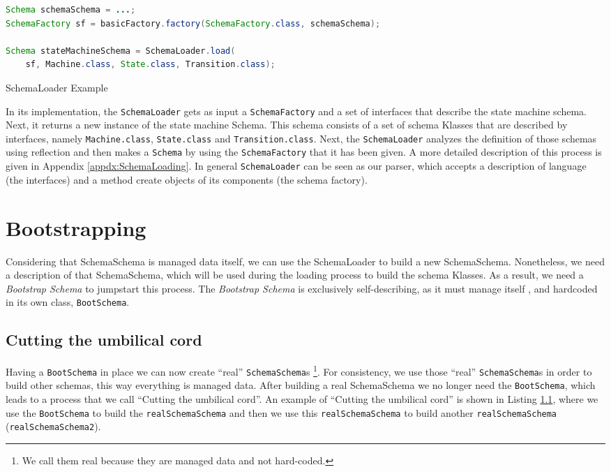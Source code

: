 \begin{sourcecode} [H]
	\begin{lstlisting}[language=Java, escapechar=|]
Schema schemaSchema = ...;
SchemaFactory sf = basicFactory.factory(SchemaFactory.class, schemaSchema);

Schema stateMachineSchema = SchemaLoader.load(
	sf, Machine.class, State.class, Transition.class);
	\end{lstlisting}
	\caption{SchemaLoader Example}
	\label{lst:SchemaLoader Example}
\end{sourcecode}

In its implementation, the \texttt{SchemaLoader} gets as input a \texttt{SchemaFactory} and a set of interfaces that describe the state machine schema.
Next, it returns a new instance of the state machine Schema.
This schema consists of a set of schema Klasses that are described by interfaces, namely \texttt{Machine.class}, \texttt{State.class} and \texttt{Transition.class}.
Next, the \texttt{SchemaLoader} analyzes the definition of those schemas using reflection and then makes a \texttt{Schema} by using the \texttt{SchemaFactory} that it has been given.
A more detailed description of this process is given in Appendix \ref{appdx:SchemaLoading}.
In general \texttt{SchemaLoader} can be seen as our parser, which accepts a description of language (the interfaces) and a method create objects of its components (the schema factory).

\section{Bootstrapping}\label{sec:Bootstrapping}
Considering that SchemaSchema is managed data itself, we can use the SchemaLoader to build a new SchemaSchema.
Nonetheless, we need a description of that SchemaSchema, which will be used during the loading process to build the schema Klasses.
As a result, we need a \textit{Bootstrap Schema} to jumpstart this process.
The \textit{Bootstrap Schema} is exclusively self-describing, as it must manage itself \cite{loh2012managed}, and hardcoded in its own class, \texttt{BootSchema}.

\subsection{Cutting the umbilical cord}\label{subsec:Cutting the umbilical cord}
Having a \texttt{BootSchema} in place we can now create ``real'' \texttt{SchemaSchema}s \footnote{
	We call them real because they are managed data and not hard-coded.}.
For consistency, we use those ``real'' \texttt{SchemaSchema}s in order to build other schemas, this way everything is managed data.
After building a real SchemaSchema we no longer need the \texttt{BootSchema}, which leads to a process that we call ``Cutting the umbilical cord''.
An example of ``Cutting the umbilical cord'' is shown in Listing \ref{subsec:Cutting the umbilical cord}, where we use the \texttt{BootSchema} to build the \texttt{realSchemaSchema} and then we use this \texttt{realSchemaSchema} to build another \texttt{realSchemaSchema} (\texttt{realSchemaSchema2}).

